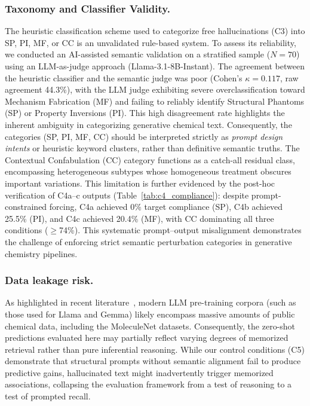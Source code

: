 \subsubsection*{Taxonomy and Classifier Validity.} The heuristic classification scheme used to categorize free hallucinations (C3) into SP, PI, MF, or CC is an unvalidated rule-based system. To assess its reliability, we conducted an AI-assisted semantic validation on a stratified sample ($N=70$) using an LLM-as-judge approach (Llama-3.1-8B-Instant). The agreement between the heuristic classifier and the semantic judge was poor (Cohen's $\kappa = 0.117$, raw agreement 44.3\%), with the LLM judge exhibiting severe overclassification toward Mechanism Fabrication (MF) and failing to reliably identify Structural Phantoms (SP) or Property Inversions (PI). This high disagreement rate highlights the inherent ambiguity in categorizing generative chemical text. Consequently, the categories (SP, PI, MF, CC) should be interpreted strictly as \textit{prompt design intents} or heuristic keyword clusters, rather than definitive semantic truths. The Contextual Confabulation (CC) category functions as a catch-all residual class, encompassing heterogeneous subtypes whose homogeneous treatment obscures important variations. This limitation is further evidenced by the post-hoc verification of C4a--c outputs (Table~\ref{tab:c4_compliance}): despite prompt-constrained forcing, C4a achieved 0\% target compliance (SP), C4b achieved 25.5\% (PI), and C4c achieved 20.4\% (MF), with CC dominating all three conditions ($\geq$74\%). This systematic prompt--output misalignment demonstrates the challenge of enforcing strict semantic perturbation categories in generative chemistry pipelines.


\subsubsection*{Data leakage risk.} As highlighted in recent literature~\cite{guo2023benchmark, white2023assessment}, modern LLM pre-training corpora (such as those used for Llama and Gemma) likely encompass massive amounts of public chemical data, including the MoleculeNet datasets. Consequently, the zero-shot predictions evaluated here may partially reflect varying degrees of memorized retrieval rather than pure inferential reasoning. While our control conditions (C5) demonstrate that structural prompts without semantic alignment fail to produce predictive gains, hallucinated text might inadvertently trigger memorized associations, collapsing the evaluation framework from a test of reasoning to a test of prompted recall.

